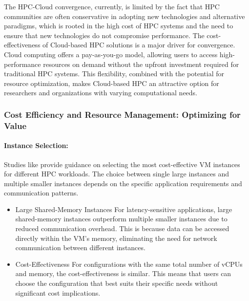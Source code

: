      The HPC-Cloud convergence, currently, is limited by the fact that HPC communities are often conservative in adopting new technologies and alternative paradigms, which is rooted in the high cost of HPC systems and the need to ensure that new technologies do not compromise performance. The cost-effectiveness of Cloud-based HPC solutions is a major driver for convergence. Cloud computing offers a pay-as-you-go model, allowing users to access high-performance resources on demand without the upfront investment required for traditional HPC systems. This flexibility, combined with the potential for resource optimization, makes Cloud-based HPC an attractive option for researchers and organizations with varying computational needs. \\


    \subsubsection{Cost Efficiency and Resource Management: Optimizing for Value}
    \label{sec:costefficiency}



    \paragraph{Instance Selection:} Studies like \cite{walkup_best_2022} provide guidance on selecting the most cost-effective VM instances for different HPC workloads. The choice between single large instances and multiple smaller instances depends on the specific application requirements and communication patterns.
    \begin{itemize}
    \item{Large Shared-Memory Instances} For latency-sensitive applications, large shared-memory instances outperform multiple smaller instances due to reduced communication overhead. This is because data can be accessed directly within the VM's memory, eliminating the need for network communication between different instances.
    \item{Cost-Effectiveness} For configurations with the same total number of vCPUs and memory, the cost-effectiveness is similar. This means that users can choose the configuration that best suits their specific needs without significant cost implications.
    \end{itemize}
